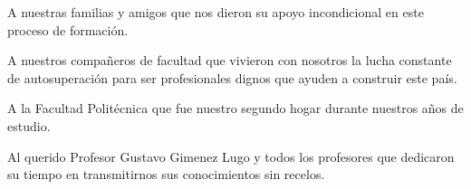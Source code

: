 \begin{thankspage} 
A nuestras familias y amigos que nos dieron su apoyo incondicional en este proceso de formación.

A nuestros compañeros de facultad que vivieron con nosotros la lucha constante de autosuperación para ser profesionales dignos que ayuden a construir este país.

A la Facultad Politécnica que fue nuestro segundo hogar durante nuestros años de estudio.

Al querido Profesor Gustavo Gimenez Lugo y todos los profesores que dedicaron su tiempo en transmitirnos sus conocimientos sin recelos.

\end{thankspage}